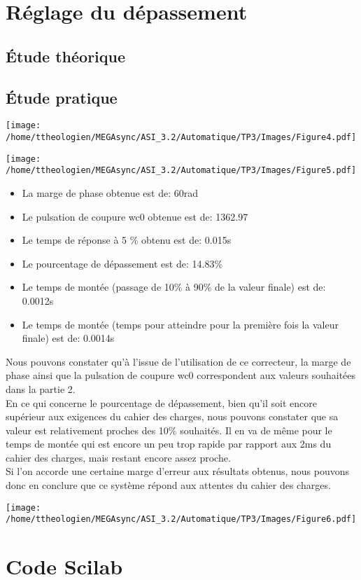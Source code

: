 \documentclass[a4paper,12pt]{article}
\begin{document}
	\section{Réglage du dépassement}
		\subsection{Étude théorique}
			\newpage
		\subsection{Étude pratique}
			\begin{center}
				\texttt{[image: /home/ttheologien/MEGAsync/ASI\_3.2/Automatique/TP3/Images/Figure4.pdf]}
			\end{center}
			\begin{center}
				\texttt{[image: /home/ttheologien/MEGAsync/ASI\_3.2/Automatique/TP3/Images/Figure5.pdf]}
			\end{center}
			\begin{itemize}
				\item La marge de phase obtenue est de: 60rad
				\item Le pulsation de coupure wc0 obtenue est de: 1362.97
				\item Le temps de réponse à 5 \% obtenu est de: 0.015s
				\item Le pourcentage de dépassement est de: 14.83\%
				\item Le temps de montée (passage de 10\% à 90\% de la valeur finale) est de: 0.0012s
				\item Le temps de montée (temps pour atteindre pour la première fois la valeur finale) est de: 0.0014s
			\end{itemize}
			Nous pouvons constater qu'à l'issue de l'utilisation de ce correcteur, la marge de phase ainsi que la pulsation de coupure wc0 correspondent aux valeurs souhaitées dans la partie 2. \\
			En ce qui concerne le pourcentage de dépassement, bien qu'il soit encore supérieur aux exigences du cahier des charges, nous pouvons constater que sa valeur est relativement proches des 10\% souhaités. Il en va de même pour le temps de montée qui est encore un peu trop rapide par rapport aux 2ms du cahier des charges, mais restant encore assez proche. \\
			Si l'on accorde une certaine marge d'erreur aux résultats obtenus, nous pouvons donc en conclure que ce système répond aux attentes du cahier des charges.
			\begin{center}
				\texttt{[image: /home/ttheologien/MEGAsync/ASI\_3.2/Automatique/TP3/Images/Figure6.pdf]}
			\end{center}


	\section{Code Scilab}
		\begin{center}
			
			
			
		\end{center}
\end{document}
